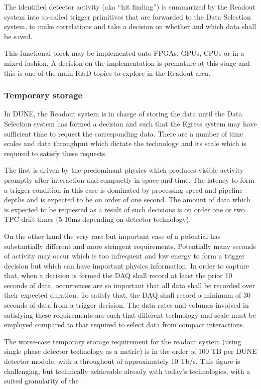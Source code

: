 The identified detector activity (aka ``hit finding'') is summarized by the Readout system into so-called trigger primitives that are forwarded to the Data Selection system, to make correlations and take a decision on whether and which data shall be saved.

This functional block may be implemented onto FPGAs, GPUs, CPUs or in a mixed fashion. A decision on the implementation is premature at this stage and this is one of the main R\&D topics to explore in the Readout area.

\subsubsection{Temporary storage}

In DUNE, the Readout system is in charge of storing the data until the Data Selection system has formed a decision and such that the Egress system may have sufficient time to request the corresponding data.
There are a number of time scales and data throughput which dictate the technology and its scale which is required to satisfy these requests.

The first is driven by the predominant physics which produces visible activity promptly after interaction and compactly in space and time. 
The latency to form a trigger condition in this case is dominated by processing speed and pipeline depths and is expected to be on order of one second.  The amount of data which is expected to be requested as a result of such decisions is on order one or two TPC drift times (5-10\si{\milli\second} depending on detector technology).

On the other hand the very rare but important case of a potential  has substantially different and more stringent requirements. 
Potentially many seconds of activity may occur which is too infrequent and low energy to form a trigger decision but which can have important physics information. 
In order to capture that, when a  decision is formed the DAQ shall record at least the prior 10 seconds of data. 
 occurrences are so important that all data shall be recorded over their expected duration. 
To satisfy that, the DAQ shall record a minimum of 30 seconds of data from a  trigger decision. 
The data rates and volumes involved in satisfying these requirements are such that different technology and scale must be employed compared to that required to select data from compact interactions.

The worse-case temporary storage requirement for the readout system (using single phase detector technology as a metric) is in the order of 100 TB per DUNE detector module, with a throughout of approximately 10 Tb/s.
This figure is challenging, but technically achievable already with today's technologies, with a suited granularity of the . 

